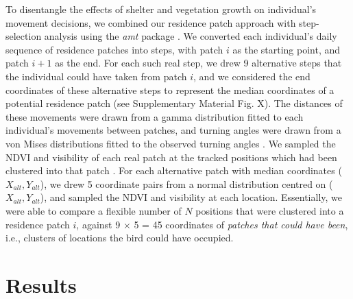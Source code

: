 \begin{refsection}
To disentangle the effects of shelter and vegetation growth on individual's movement decisions, we combined our residence patch approach with step-selection analysis \citep{thurfjell2014,avgar2016} using the \textit{amt} package \citep{signer2019}.
We converted each individual's daily sequence of residence patches into steps, with patch $i$ as the starting point, and patch $i+1$ as the end.
For each such real step, we drew 9 alternative steps that the individual could have taken from patch $i$, and we considered the end coordinates of these alternative steps to represent the median coordinates of a potential residence patch (see Supplementary Material Fig. X).
The distances of these movements were drawn from a gamma distribution fitted to each individual's movements between patches, and turning angles were drawn from a von Mises distributions fitted to the observed turning angles \citep{signer2019}.
We sampled the NDVI and visibility of each real patch at the tracked positions which had been clustered into that patch \citep{gupte2021b}.
For each alternative patch with median coordinates ($X_{alt}, Y_{alt}$), we drew 5 coordinate pairs from a normal distribution centred on ($X_{alt}, Y_{alt}$), and sampled the NDVI and visibility at each location.
Essentially, we were able to compare a flexible number of $N$ positions that were clustered into a residence patch $i$, against 9 $ \times$ 5 = 45 coordinates of \textit{patches that could have been}, i.e., clusters of locations the bird could have occupied.

\section*{Results}


\end{refsection}
